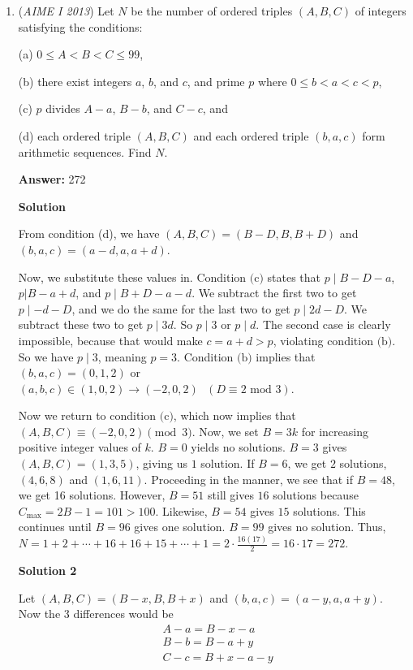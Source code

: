 \begin{enumerate}
 


 


	\item (\textit{AIME I 2013}) Let $N$ be the number of ordered triples $(A,B,C)$ of integers satisfying the conditions: 


 (a) $0\le A<B<C\le99$, 


 (b) there exist integers $a$, $b$, and $c$, and prime $p$ where $0\le b<a<c<p$, 


 (c) $p$ divides $A-a$, $B-b$, and $C-c$, and 


 (d) each ordered triple $(A,B,C)$ and each ordered triple $(b,a,c)$ form arithmetic sequences. Find $N$.


 
 \textbf{Answer: }272



\textbf{Solution}

From condition (d), we have $(A,B,C)=(B-D,B,B+D)$ and $(b,a,c)=(a-d,a,a+d)$.

 
Now, we substitute these values in. Condition $\text{(c)}$ states that $p\mid B-D-a$, $p | B-a+d$, and $p\mid B+D-a-d$. We subtract the first two to get $p\mid-d-D$, and we do the same for the last two to get $p\mid 2d-D$. We subtract these two to get $p\mid 3d$. So $p\mid 3$ or $p\mid d$. The second case is clearly impossible, because that would make $c=a+d>p$, violating condition $\text{(b)}$. So we have $p\mid 3$, meaning $p=3$. Condition $\text{(b)}$ implies that $(b,a,c)=(0,1,2)$ or $(a,b,c)\in (1,0,2)\rightarrow (-2,0,2)\text{ }(D\equiv 2\text{ mod 3})$. 

 
Now we return to condition $\text{(c)}$, which now implies that $(A,B,C)\equiv(-2,0,2)\pmod{3}$. Now, we set $B=3k$ for increasing positive integer values of $k$. $B=0$ yields no solutions. $B=3$ gives $(A,B,C)=(1,3,5)$, giving us $1$ solution. If $B=6$, we get $2$ solutions, $(4,6,8)$ and $(1,6,11)$. Proceeding in the manner, we see that if $B=48$, we get 16 solutions. However, $B=51$ still gives $16$ solutions because $C_\text{max}=2B-1=101>100$. Likewise, $B=54$ gives $15$ solutions. This continues until $B=96$ gives one solution. $B=99$ gives no solution. Thus, $N=1+2+\cdots+16+16+15+\cdots+1=2\cdot\frac{16(17)}{2}=16\cdot 17=\boxed{272}$.

 



\textbf{Solution 2}

Let $(A, B, C) = (B-x, B, B+x)$ and $(b, a, c) = (a-y, a, a+y)$. Now the 3 differences would be 
 \begin{align} \label{1} &A-a = B-x-a \\ \label{2} &B - b = B-a+y \\ \label{3} &C - c = B+x-a-y  \end{align}


\end{enumerate}
